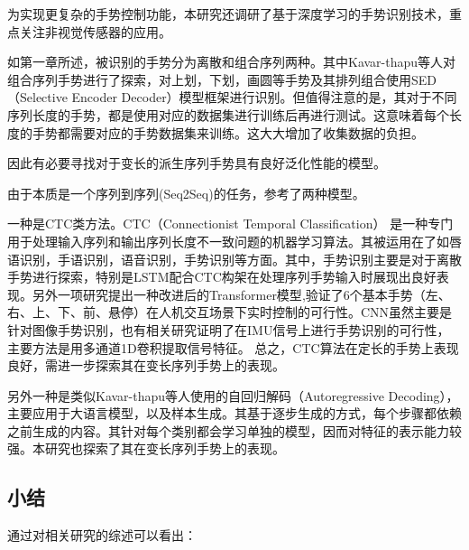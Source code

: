 为实现更复杂的手势控制功能，本研究还调研了基于深度学习的手势识别技术，重点关注非视觉传感器的应用。

如第一章所述，被识别的手势分为离散和组合序列两种。其中Kavar-thapu等人\cites{kavarthapu2017hand}对组合序列手势进行了探索，对上划，下划，画圆等手势及其排列组合使用SED（Selective Encoder Decoder）模型框架进行识别。但值得注意的是，其对于不同序列长度的手势，都是使用对应的数据集进行训练后再进行测试。这意味着每个长度的手势都需要对应的手势数据集来训练。这大大增加了收集数据的负担。

因此有必要寻找对于变长的派生序列手势具有良好泛化性能的模型。

由于本质是一个序列到序列(Seq2Seq)的任务，参考了两种模型。

一种是CTC类方法。CTC（Connectionist Temporal Classification）\cites{graves2006connectionist} 是一种专门用于处理输入序列和输出序列长度不一致问题的机器学习算法。其被运用在了如唇语识别\cites{xu2018lcanet}，手语识别\cites{li2020key}，语音识别\cites{lee2021intermediate}，手势识别\cites{wang2024continuous,karnerrealtime, dahiya2024efficient,sakuma2022mlp}等方面。其中，手势识别主要是对于离散手势进行探索，特别是LSTM配合CTC构架在处理序列手势输入时展现出良好表现。另外一项研究提出一种改进后的Transformer模型\cites{wang2024continuous},验证了6个基本手势（左、右、上、下、前、悬停）在人机交互场景下实时控制的可行性。CNN虽然主要是针对图像手势识别，也有相关研究证明了在IMU信号上进行手势识别的可行性\cites{karnerrealtime, dahiya2024efficient,sakuma2022mlp}，主要方法是用多通道1D卷积提取信号特征。
总之，CTC算法在定长的手势上表现良好，需进一步探索其在变长序列手势上的表现。

另外一种是类似Kavar-thapu等人\cites{kavarthapu2017hand}使用的自回归解码（Autoregressive Decoding），主要应用于大语言模型\cites{you2024linear}，以及样本生成\cites{kaneko2022transgesture}。其基于逐步生成的方式，每个步骤都依赖之前生成的内容。其针对每个类别都会学习单独的模型，因而对特征的表示能力较强。本研究也探索了其在变长序列手势上的表现。

\subsection{小结}

通过对相关研究的综述可以看出：

